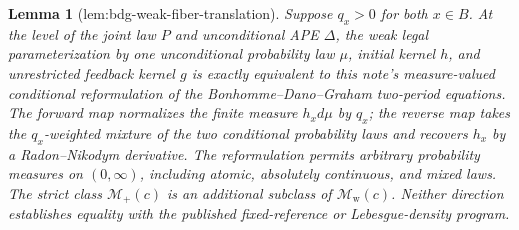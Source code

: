 \documentclass{article}
\newtheorem{lemma}{Lemma}
\begin{document}
\begin{lemma}[lem:bdg-weak-fiber-translation]\label{lem:bdg-weak-fiber-translation}
Suppose \(q_x>0\) for both \(x\in B\).  At the level of the joint law \(P\) and unconditional APE \(\Delta\), the weak legal parameterization by one unconditional probability law \(\mu\), initial kernel \(h\), and unrestricted feedback kernel \(g\) is exactly equivalent to this note's measure-valued conditional reformulation of the Bonhomme--Dano--Graham two-period equations.  The forward map normalizes the finite measure \(h_xd\mu\) by \(q_x\); the reverse map takes the \(q_x\)-weighted mixture of the two conditional probability laws and recovers \(h_x\) by a Radon--Nikodym derivative.  The reformulation permits arbitrary probability measures on \((0,\infty)\), including atomic, absolutely continuous, and mixed laws.  The strict class \(\mathcal M_+(c)\) is an additional subclass of \(\mathcal M_{\mathrm w}(c)\).  Neither direction establishes equality with the published fixed-reference or Lebesgue-density program.
\end{lemma}
\end{document}
